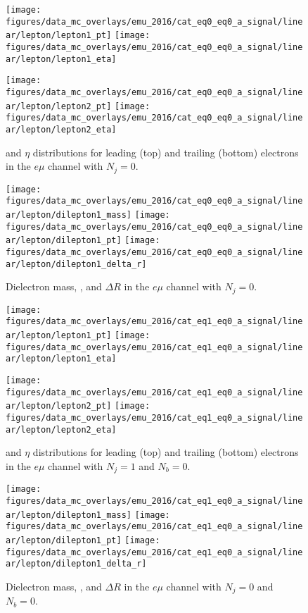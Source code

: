 \begin{figure}[htb!]
    \centering
    \texttt{[image: figures/data\_mc\_overlays/emu\_2016/cat\_eq0\_eq0\_a\_signal/linear/lepton/lepton1\_pt]}
    \texttt{[image: figures/data\_mc\_overlays/emu\_2016/cat\_eq0\_eq0\_a\_signal/linear/lepton/lepton1\_eta]}

    \texttt{[image: figures/data\_mc\_overlays/emu\_2016/cat\_eq0\_eq0\_a\_signal/linear/lepton/lepton2\_pt]}
    \texttt{[image: figures/data\_mc\_overlays/emu\_2016/cat\_eq0\_eq0\_a\_signal/linear/lepton/lepton2\_eta]}
    \caption{\pt and $\eta$ distributions for leading (top) and trailing
    (bottom) electrons in the $e\mu$ channel with $N_{j} = 0$.}
    \label{fig:emu_1_kinematic}
\end{figure}

\begin{figure}[htb!]
    \centering
    \texttt{[image: figures/data\_mc\_overlays/emu\_2016/cat\_eq0\_eq0\_a\_signal/linear/lepton/dilepton1\_mass]}
    \texttt{[image: figures/data\_mc\_overlays/emu\_2016/cat\_eq0\_eq0\_a\_signal/linear/lepton/dilepton1\_pt]}
    \texttt{[image: figures/data\_mc\_overlays/emu\_2016/cat\_eq0\_eq0\_a\_signal/linear/lepton/dilepton1\_delta\_r]}
    \caption{Dielectron mass, \pt, and $\Delta R$ in the $e\mu$ channel
    with $N_{j} = 0$.}
    \label{fig:emu_1_dilepton}
\end{figure}

\begin{figure}[htb!]
    \centering
    \texttt{[image: figures/data\_mc\_overlays/emu\_2016/cat\_eq1\_eq0\_a\_signal/linear/lepton/lepton1\_pt]}
    \texttt{[image: figures/data\_mc\_overlays/emu\_2016/cat\_eq1\_eq0\_a\_signal/linear/lepton/lepton1\_eta]}

    \texttt{[image: figures/data\_mc\_overlays/emu\_2016/cat\_eq1\_eq0\_a\_signal/linear/lepton/lepton2\_pt]}
    \texttt{[image: figures/data\_mc\_overlays/emu\_2016/cat\_eq1\_eq0\_a\_signal/linear/lepton/lepton2\_eta]}
    \caption{\pt and $\eta$ distributions for leading (top) and trailing
        (bottom) electrons in the $e\mu$ channel with $N_{j} = 1$ and
        $N_{b} = 0$.}
    \label{fig:emu_2_kinematic}
\end{figure}

\begin{figure}[htb!]
    \centering
    \texttt{[image: figures/data\_mc\_overlays/emu\_2016/cat\_eq1\_eq0\_a\_signal/linear/lepton/dilepton1\_mass]}
    \texttt{[image: figures/data\_mc\_overlays/emu\_2016/cat\_eq1\_eq0\_a\_signal/linear/lepton/dilepton1\_pt]}
    \texttt{[image: figures/data\_mc\_overlays/emu\_2016/cat\_eq1\_eq0\_a\_signal/linear/lepton/dilepton1\_delta\_r]}
    \caption{Dielectron mass, \pt, and $\Delta R$ in the $e\mu$ channel
    with $N_{j} = 0$ and $N_{b} = 0$.}
    \label{fig:emu_2_dilepton}
\end{figure}

